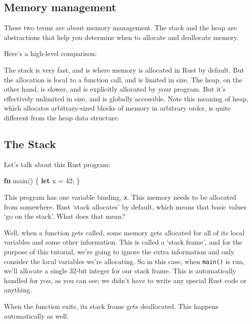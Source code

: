 \documentclass[a4paper,]{book}
\renewcommand*{\hypertarget}[3][\ar]{%
  \def\ar{#2}%
  \label{#1}%
  #3}
\newenvironment{Shaded}{\begin{snugshade}}{\end{snugshade}}
\newcommand{\KeywordTok}[1]{\textcolor[rgb]{0.13,0.29,0.53}{\textbf{{#1}}}}
\newcommand{\DecValTok}[1]{\textcolor[rgb]{0.00,0.00,0.81}{{#1}}}
\newcommand{\NormalTok}[1]{{#1}}
\begin{document}
\subsection{Memory management}\label{memory-management}

These two terms are about memory management. The stack and the heap are
abstractions that help you determine when to allocate and deallocate
memory.

Here's a high-level comparison:

The stack is very fast, and is where memory is allocated in Rust by
default. But the allocation is local to a function call, and is limited
in size. The heap, on the other hand, is slower, and is explicitly
allocated by your program. But it's effectively unlimited in size, and
is globally accessible. Note this meaning of heap, which allocates
arbitrary-sized blocks of memory in arbitrary order, is quite different
from the heap data structure.

\hypertarget{the-stack}{\subsection{The Stack}\label{the-stack}}

Let's talk about this Rust program:

\begin{Shaded}
\begin{Highlighting}[]
\KeywordTok{fn} \NormalTok{main() \{}
    \KeywordTok{let} \NormalTok{x = }\DecValTok{42}\NormalTok{;}
\NormalTok{\}}
\end{Highlighting}
\end{Shaded}

This program has one variable binding, \texttt{x}. This memory needs to
be allocated from somewhere. Rust `stack allocates' by default, which
means that basic values `go on the stack'. What does that mean?

Well, when a function gets called, some memory gets allocated for all of
its local variables and some other information. This is called a `stack
frame', and for the purpose of this tutorial, we're going to ignore the
extra information and only consider the local variables we're
allocating. So in this case, when \texttt{main()} is run, we'll allocate
a single 32-bit integer for our stack frame. This is automatically
handled for you, as you can see; we didn't have to write any special
Rust code or anything.

When the function exits, its stack frame gets deallocated. This happens
automatically as well.
\end{document}

